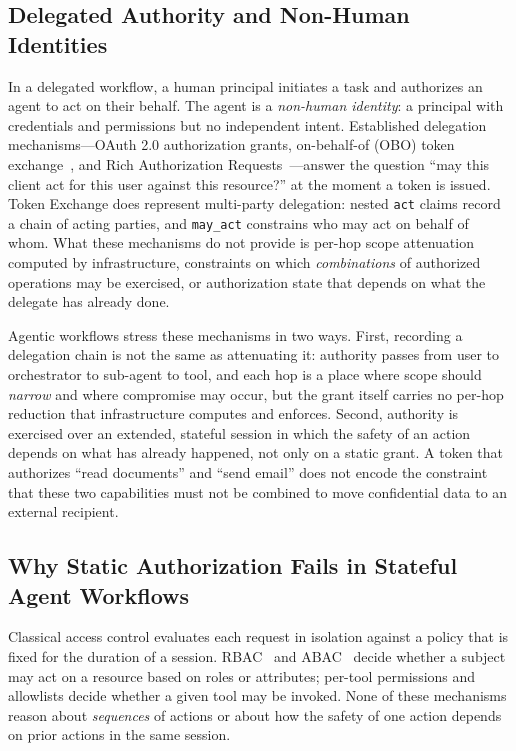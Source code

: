 \documentclass[sigconf,nonacm]{acmart}
\begin{document}
\subsection{Delegated Authority and Non-Human Identities}

In a delegated workflow, a human principal initiates a task and authorizes an agent to act on their behalf. The agent is a \emph{non-human identity}: a principal with credentials and permissions but no independent intent. Established delegation mechanisms---OAuth 2.0 authorization grants, on-behalf-of (OBO) token exchange~\cite{rfc8693}, and Rich Authorization Requests~\cite{rfc9396}---answer the question ``may this client act for this user against this resource?'' at the moment a token is issued. Token Exchange does represent multi-party delegation: nested \texttt{act} claims record a chain of acting parties, and \texttt{may\_act} constrains who may act on behalf of whom. What these mechanisms do not provide is per-hop scope attenuation computed by infrastructure, constraints on which \emph{combinations} of authorized operations may be exercised, or authorization state that depends on what the delegate has already done.

Agentic workflows stress these mechanisms in two ways. First, recording a delegation chain is not the same as attenuating it: authority passes from user to orchestrator to sub-agent to tool, and each hop is a place where scope should \emph{narrow} and where compromise may occur, but the grant itself carries no per-hop reduction that infrastructure computes and enforces. Second, authority is exercised over an extended, stateful session in which the safety of an action depends on what has already happened, not only on a static grant. A token that authorizes ``read documents'' and ``send email'' does not encode the constraint that these two capabilities must not be combined to move confidential data to an external recipient.

\subsection{Why Static Authorization Fails in Stateful Agent Workflows}

Classical access control evaluates each request in isolation against a policy that is fixed for the duration of a session. RBAC~\cite{sandhu1996} and ABAC~\cite{hu2014} decide whether a subject may act on a resource based on roles or attributes; per-tool permissions and allowlists decide whether a given tool may be invoked. None of these mechanisms reason about \emph{sequences} of actions or about how the safety of one action depends on prior actions in the same session.
\end{document}
